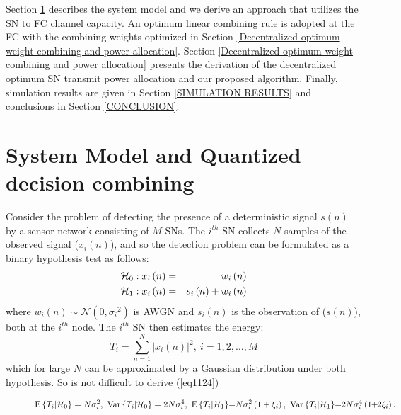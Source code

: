 \documentclass[conference]{IEEEtran}
\begin{document}
\indent Section \ref{sec:format} describes the system model and we derive an approach that utilizes the SN to FC channel capacity. An optimum linear combining rule is adopted at the FC with the combining weights optimized in Section \ref{Decentralized optimum weight combining and power allocation}. Section \ref{Decentralized optimum weight combining and power allocation} presents the derivation of the decentralized optimum SN transmit power allocation and our proposed algorithm. Finally, simulation results are given in Section \ref{SIMULATION RESULTS} and conclusions in Section \ref{CONCLUSION}.
\section{System Model and Quantized decision combining}
\label{sec:format}
Consider the problem of detecting the presence of a deterministic signal $s(n)$ by a sensor network consisting of $M$ SNs. The $i^{th}$ SN collects $N$ samples of the observed signal ($x_i(n)$), and so the detection problem can be formulated as a binary hypothesis test as follows: 
\begin{eqnarray}
\hspace*{-0.3cm}
\mathcal{ H}_0: x_i\left(n\right) &=&w_i\left(n\right) \\
\mathcal{ H}_1: x_i\left(n\right) &=& s_i\left(n\right)+w_i\left(n\right)
\end{eqnarray}
where $w_i(n)\sim \mathcal{N}(0,{\sigma_{i}}^{2})$ is AWGN and $s_i(n)$ is the observation of ($s(n)$), both at the $i^{th}$ node. The $i^{th}$ SN then estimates the energy:
\begin{equation}\label{eq1}
     T_i=\sum \limits_{n=1}^N \left|x_i(n)\right|^{2},  \ i = 1, 2, \ldots, M
\end{equation}
which for large $N$ can be approximated by a Gaussian distribution \cite{les98} under both hypothesis. So is not difficult to derive (\ref{eq1124})
\begin{figure*}[h!tb]
\normalsize
\begin{eqnarray}
\mathrm{E}\left\{T_i|\mathcal{ H}_0\right\}=N\sigma_i^{2}, \ \mathrm{Var}\left\{T_i|\mathcal{ H}_0\right\}=2N\sigma_i^{4},\
\mathrm{E}\left\{T_i|\mathcal{ H}_1\right\}\hspace{-0.1cm}=\hspace{-0.1cm}N\sigma_i^{2}\left(1+\xi_i \right),  \ \mathrm{Var}\left\{T_i|\mathcal{ H}_1\right\}\hspace{-0.1cm}=\hspace{-0.1cm}2N\sigma_i^{4}\left(1\hspace{-0.1cm}+\hspace{-0.1cm}2\xi_i \right).
\hspace*{-0.25cm}
\label{eq1124}
\end{eqnarray}
\hrulefill
\vspace*{-12pt}
\end{figure*}
\end{document}
